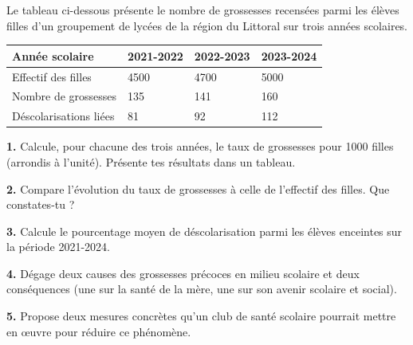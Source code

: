 \documentclass[11pt]{article}
\begin{document}
\begin{exercice}
Le tableau ci-dessous présente le nombre de grossesses recensées parmi les élèves filles d'un groupement de lycées de la région du Littoral sur trois années scolaires.

\begin{center}
\begin{tabularx}{\linewidth}{|l|X|X|X|}
\hline
\rowcolor{popblueL} \textbf{Année scolaire} & \textbf{2021-2022} & \textbf{2022-2023} & \textbf{2023-2024} \\
\hline
Effectif des filles & \num{4500} & \num{4700} & \num{5000} \\
\hline
Nombre de grossesses & 135 & 141 & 160 \\
\hline
Déscolarisations liées & 81 & 92 & 112 \\
\hline
\end{tabularx}
\end{center}

\textbf{1.} Calcule, pour chacune des trois années, le taux de grossesses pour 1000 filles (arrondis à l'unité). Présente tes résultats dans un tableau.

\textbf{2.} Compare l'évolution du taux de grossesses à celle de l'effectif des filles. Que constates-tu ?

\textbf{3.} Calcule le pourcentage moyen de déscolarisation parmi les élèves enceintes sur la période 2021-2024.

\textbf{4.} Dégage deux causes des grossesses précoces en milieu scolaire et deux conséquences (une sur la santé de la mère, une sur son avenir scolaire et social).

\textbf{5.} Propose deux mesures concrètes qu'un club de santé scolaire pourrait mettre en œuvre pour réduire ce phénomène.
\end{exercice}
\end{document}
